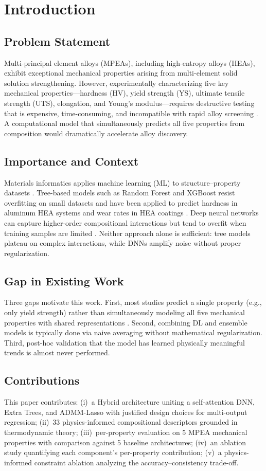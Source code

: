\documentclass[conference]{IEEEtran}
\begin{document}
\section{Introduction}

\subsection{Problem Statement}
Multi-principal element alloys (MPEAs), including high-entropy alloys (HEAs), exhibit exceptional mechanical properties arising from multi-element solid solution strengthening. However, experimentally characterizing five key mechanical properties---hardness (HV), yield strength (YS), ultimate tensile strength (UTS), elongation, and Young's modulus---requires destructive testing that is expensive, time-consuming, and incompatible with rapid alloy screening \cite{b1}. A computational model that simultaneously predicts all five properties from composition would dramatically accelerate alloy discovery.

\subsection{Importance and Context}
Materials informatics applies machine learning (ML) to structure--property datasets \cite{b3}. Tree-based models such as Random Forest \cite{b13} and XGBoost \cite{b15} resist overfitting on small datasets and have been applied to predict hardness in aluminum HEA systems \cite{b18} and wear rates in HEA coatings \cite{b21}. Deep neural networks can capture higher-order compositional interactions but tend to overfit when training samples are limited \cite{b10}. Neither approach alone is sufficient: tree models plateau on complex interactions, while DNNs amplify noise without proper regularization.

\subsection{Gap in Existing Work}
Three gaps motivate this work. First, most studies predict a single property (e.g., only yield strength) rather than simultaneously modeling all five mechanical properties with shared representations \cite{b19,b22}. Second, combining DL and ensemble models is typically done via naive averaging without mathematical regularization. Third, post-hoc validation that the model has learned physically meaningful trends is almost never performed.

\subsection{Contributions}
This paper contributes: (i)~a Hybrid architecture uniting a self-attention DNN, Extra Trees, and ADMM-Lasso with justified design choices for multi-output regression; (ii)~33 physics-informed compositional descriptors grounded in thermodynamic theory; (iii)~per-property evaluation on 5 MPEA mechanical properties with comparison against 5 baseline architectures; (iv)~an ablation study quantifying each component's per-property contribution; (v)~a physics-informed constraint ablation analyzing the accuracy--consistency trade-off.
\end{document}
